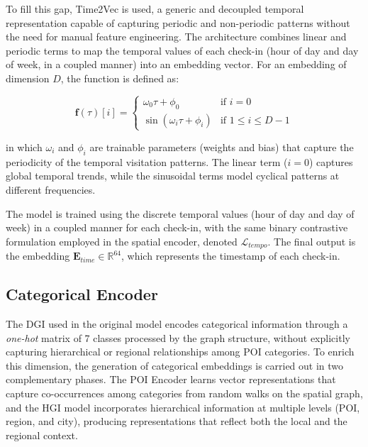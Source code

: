 To fill this gap, Time2Vec \cite{kazemi2019time2vec} is used, a generic and decoupled temporal representation capable of capturing periodic and non-periodic patterns without the need for manual feature engineering. The architecture combines linear and periodic terms to map the temporal values of each check-in (hour of day and day of week, in a coupled manner) into an embedding vector. For an embedding of dimension $D$, the function is defined as:

\begin{equation}
\mathbf{f}(\tau)[i] = \begin{cases} \omega_0 \tau + \phi_0 & \text{if } i=0 \\ \sin(\omega_i \tau + \phi_i) & \text{if } 1 \leq i \leq D-1 \end{cases}
\label{eq:courb:time2vec}
\end{equation}

in which $\omega_i$ and $\phi_i$ are trainable parameters (weights and bias) that capture the periodicity of the temporal visitation patterns. The linear term ($i=0$) captures global temporal trends, while the sinusoidal terms model cyclical patterns at different frequencies.

The model is trained using the discrete temporal values (hour of day and day of week) in a coupled manner for each check-in, with the same binary contrastive formulation employed in the spatial encoder, denoted $\mathcal{L}_{tempo}$. The final output is the embedding $\mathbf{E}_{time} \in \mathbb{R}^{64}$, which represents the timestamp of each check-in.

\subsection{Categorical Encoder}

The DGI used in the original model encodes categorical information through a \textit{one-hot} matrix of 7 classes processed by the graph structure, without explicitly capturing hierarchical or regional relationships among POI categories. To enrich this dimension, the generation of categorical embeddings is carried out in two complementary phases. The POI Encoder learns vector representations that capture co-occurrences among categories from random walks on the spatial graph, and the HGI model \cite{huang2023hgi} incorporates hierarchical information at multiple levels (POI, region, and city), producing representations that reflect both the local and the regional context.

